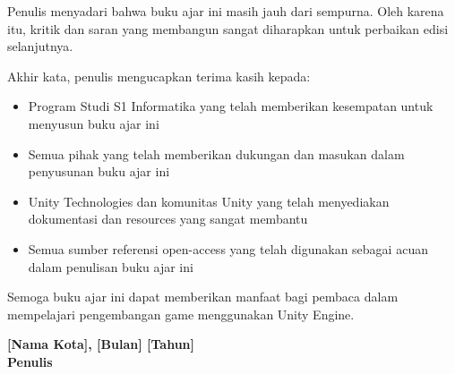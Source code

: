 Penulis menyadari bahwa buku ajar ini masih jauh dari sempurna. Oleh karena itu, kritik dan saran yang membangun sangat diharapkan untuk perbaikan edisi selanjutnya.

Akhir kata, penulis mengucapkan terima kasih kepada:
\begin{itemize}
\item Program Studi S1 Informatika yang telah memberikan kesempatan untuk menyusun buku ajar ini
\item Semua pihak yang telah memberikan dukungan dan masukan dalam penyusunan buku ajar ini
\item Unity Technologies dan komunitas Unity yang telah menyediakan dokumentasi dan resources yang sangat membantu
\item Semua sumber referensi open-access yang telah digunakan sebagai acuan dalam penulisan buku ajar ini
\end{itemize}

Semoga buku ajar ini dapat memberikan manfaat bagi pembaca dalam mempelajari pengembangan game menggunakan Unity Engine.

\vfill

\begin{flushright}
\textbf{[Nama Kota], [Bulan] [Tahun]}\\[0.5cm]
\textbf{Penulis}
\end{flushright}
